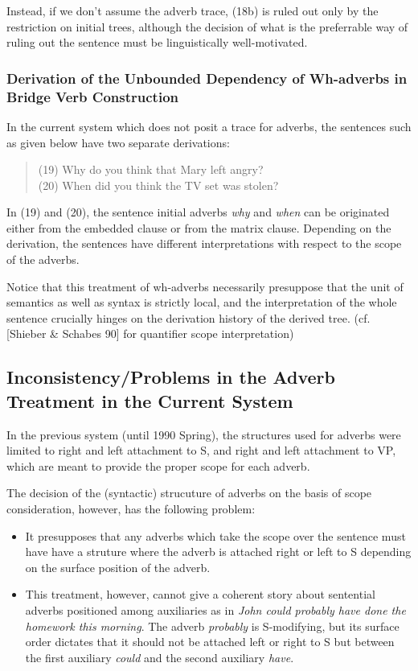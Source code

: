 Instead, if we don't assume the adverb trace, (18b) is ruled out only
by the restriction on initial trees, although the decision of what is
the preferrable way of ruling out the sentence must be linguistically
well-motivated.

\subsubsection{Derivation of the Unbounded Dependency of Wh-adverbs in
Bridge Verb Construction}

In the current system which does not posit a trace for adverbs, the
sentences such as given below have two separate derivations:

\begin{verse}
(19) Why do you think that Mary left angry?\\
(20) When did you think the TV set was stolen?
\end{verse}

\noindent
In (19) and (20), the sentence initial adverbs {\em why\/} and {\em
when\/} can be originated either from the embedded clause or from the 
matrix clause. Depending on the derivation, the sentences have different 
interpretations with respect to the scope of the adverbs. 

Notice that this treatment of wh-adverbs necessarily presuppose that the
unit of semantics as well as syntax is strictly local, and the
interpretation of the whole sentence crucially hinges on the derivation
history of the derived tree. (cf. [Shieber \& Schabes 90] for 
quantifier scope interpretation)



\subsection{Inconsistency/Problems in the Adverb Treatment in the Current System}

In the previous system (until 1990 Spring), the structures used for adverbs
were limited to right and left attachment to S, and right and left attachment
to VP, which are meant to provide the proper scope for each adverb. 

The decision of the (syntactic) strucuture of adverbs on the basis of scope
consideration, however, has the following problem:

\begin{itemize}
\item It presupposes that any adverbs which take the scope over the sentence
must have have a struture where the adverb is attached right or left to
S depending on the surface position of the adverb.
\item This treatment, however, cannot give a coherent story about sentential
adverbs positioned among auxiliaries as in {\em John could probably have
done the homework this morning\/}. The adverb {\em probably\/} is
S-modifying, but its surface order dictates that it should not be
attached left or right to S but between the first auxiliary {\em could\/}
and the second auxiliary {\em have\/}.
\end{itemize}

